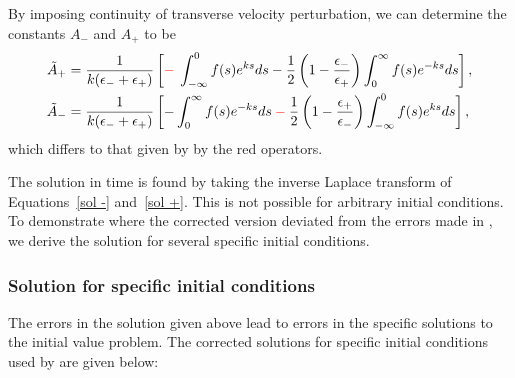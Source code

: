 \documentclass[12pt, draft]{../style-files/ociamthesis}
\begin{document}
By imposing continuity of transverse velocity perturbation, we can determine the constants $A_-$ and $A_+$ to be
\begin{align}
\tilde{A}_+ & = \frac{1}{k(\epsilon_- + \epsilon_+)}\left[\textcolor{red}{-} \: \int_{-\infty}^0 f(s)e^{ks} ds - \frac{1}{2}\left(1 - \frac{\epsilon_-}{\epsilon_+}\right)\int_0^\infty f(s)e^{-ks} ds\right], \\
\tilde{A}_- & = \frac{1}{k(\epsilon_- + \epsilon_+)}\left[-\int_0^\infty f(s)e^{-ks} ds \: \textcolor{red}{-} \: \frac{1}{2}\left(1 - \frac{\epsilon_+}{\epsilon_-}\right)\int_{-\infty}^0 f(s)e^{ks} ds\right],
\end{align}
which differs to that given by \cite{rae_etal81} by the red operators.

The solution in time is found by taking the inverse Laplace transform of Equations~\eqref{sol -} and~\eqref{sol +}. This is not possible for arbitrary initial conditions. To demonstrate where the corrected version deviated from the errors made in \cite{rae_etal81}, we derive the solution for several specific initial conditions.


\subsubsection{Solution for specific initial conditions}

The errors in the solution given above lead to errors in the specific solutions to the initial value problem. The corrected solutions for specific initial conditions used by \cite{rae_etal81} are given below:
\end{document}
